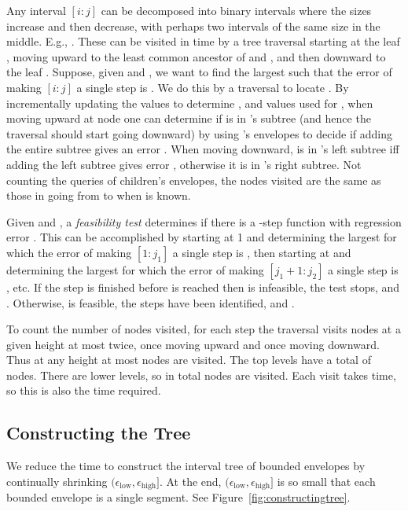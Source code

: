 \documentclass[11pt]{article}
\newcommand{\inter}[2]{\ensuremath{[#1\!:\!#2]}}
\newcommand{\epslow}{\ensuremath{\epsilon_\mathrm{low}}}
\newcommand{\epshigh}{\ensuremath{\epsilon_\mathrm{high}}}
\newcommand{\epsinterval}[1]{\ensuremath{(\epslow,\epshigh#1}}
\begin{document}
Any interval \inter{i}{j} can be decomposed into 
binary intervals where the sizes increase and then decrease, with perhaps two intervals of the same size in the middle.
E.g.,  .
These can be visited in  time by a tree traversal starting at the leaf , moving upward to the least common ancestor of  and , and then downward to the leaf .
Suppose, given  and , we want to find the largest  such that the error of making \inter{i}{j} a single step is .
We do this by a traversal to locate .
By incrementally updating the  values to determine , and  values used for , when moving upward at node  one can determine if  is in 's subtree (and hence the traversal should start going downward) by using 's envelopes to decide if adding the entire subtree gives an error .
When moving downward,  is in 's left subtree iff adding the left subtree gives error , otherwise it is in 's right subtree.
Not counting the queries of children's envelopes, the nodes visited are the same as those in going from  to  when  is known.


Given  and , a \textit{feasibility test} determines if there is a -step function with regression error .
This can be accomplished by starting at 1 and determining the largest  for which the error of making \inter{1}{j_1} a single step is , then starting at  and determining the largest  for which the error of making \inter{j_1+1}{j_2} a single step is , etc.
If the  step is finished before  is reached then  is infeasible, the test stops, and .
Otherwise,  is feasible, the steps have been identified, and .

To count the number of nodes visited, for each step the traversal visits nodes at a given height at most twice, once moving upward and once moving downward.
Thus at any height at most  nodes are visited.
The top  levels have a total of  nodes.
There are  lower levels, so in total 
 nodes are visited.
Each visit takes  time, so this is also the time required.



\subsection{Constructing the Tree}

We reduce the time to construct the interval tree of bounded envelopes by continually shrinking \epsinterval{]}.
At the end, \epsinterval{]} is so small that each bounded envelope is a single segment.
See Figure~\ref{fig:constructingtree}.
\end{document}
